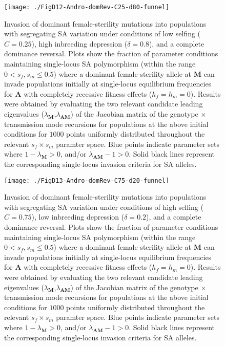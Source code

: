 \documentclass{article}
\begin{document}
\begin{figure}[ht!]
\centering
\texttt{[image: ./FigD12-Andro-domRev-C25-d80-funnel]}
\caption{Invasion of dominant female-sterility mutations into populations with segregating SA variation under conditions of low selfing ($C = 0.25$), high inbreeding depression ($\delta = 0.8$), and a complete dominance reversal. Plots show the fraction of parameter conditions maintaining single-locus SA polymorphism (within the range $0 < s_f,s_m \leq 0.5$) where a dominant female-sterility allele at $\mathbf{M}$ can invade populations initially at single-locus equilibrium frequencies for $\mathbf{A}$ with completely recessive fitness effects ($h_f=h_m=0$). Results were obtained by evaluating the two relevant candidate leading eigenvalues ($\lambda_{\mathbf{M}}$,$\lambda_{\mathbf{AM}}$) of the Jacobian matrix of the genotype $\times$ transmission mode recursions for populations at the above initial conditions for $1000$ points uniformly distributed throughout the relevant $s_f \times s_m$ paramter space. Blue points indicate parameter sets where $1 - \lambda_{\mathbf{M}} > 0$, and/or $\lambda_{\mathbf{AM}} - 1 > 0$. Solid black lines represent the corresponding single-locus invasion criteria for SA alleles.}
\label{fig:AndC25d80FunnelDomRev}
\end{figure}
\newpage{}

\begin{figure}[ht!]
\centering
\texttt{[image: ./FigD13-Andro-domRev-C75-d20-funnel]}
\caption{Invasion of dominant female-sterility mutations into populations with segregating SA variation under conditions of high selfing ($C = 0.75$), low inbreeding depression ($\delta = 0.2$), and a complete dominance reversal. Plots show the fraction of parameter conditions maintaining single-locus SA polymorphism (within the range $0 < s_f,s_m \leq 0.5$) where a dominant female-sterility allele at $\mathbf{M}$ can invade populations initially at single-locus equilibrium frequencies for $\mathbf{A}$ with completely recessive fitness effects ($h_f=h_m=0$). Results were obtained by evaluating the two relevant candidate leading eigenvalues ($\lambda_{\mathbf{M}}$,$\lambda_{\mathbf{AM}}$) of the Jacobian matrix of the genotype $\times$ transmission mode recursions for populations at the above initial conditions for $1000$ points uniformly distributed throughout the relevant $s_f \times s_m$ paramter space. Blue points indicate parameter sets where $1 - \lambda_{\mathbf{M}} > 0$, and/or $\lambda_{\mathbf{AM}} - 1 > 0$. Solid black lines represent the corresponding single-locus invasion criteria for SA alleles.}
\label{fig:AndC75d20FunnelDomRev}
\end{figure}
\newpage{}
\end{document}
